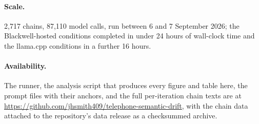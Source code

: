 \documentclass[11pt]{article}
\begin{document}
\paragraph{Scale.}
2{,}717 chains, 87{,}110 model calls, run between 6 and 7 September 2026;
the Blackwell-hosted conditions completed in under 24 hours of wall-clock
time and the llama.cpp conditions in a further 16 hours.

\paragraph{Availability.}
The runner, the analysis script that produces every figure and table here,
the prompt files with their anchors, and the full per-iteration chain
texts are at \url{https://github.com/jhsmith409/telephone-semantic-drift},
with the chain data attached to the repository's data release as a
checksummed archive.
\end{document}
